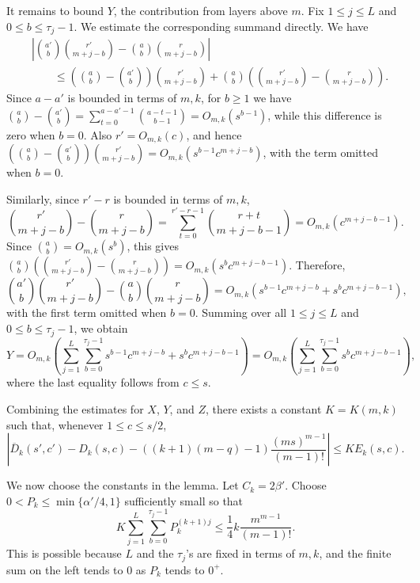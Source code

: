 \documentclass[10pt,a4paper]{article}
\numberwithin{equation}{section}
\theoremstyle{definition}
\begin{document}
It remains to bound $Y$, the contribution from layers above $m$.
Fix $1\le j\le L$ and $0\le b\le\tau_j-1$.
We estimate the corresponding summand directly.
We have
\begin{align*}
         & \left|
        \binom{a'}b\binom{r'}{m+j-b}
        -
        \binom ab\binom r{m+j-b}
        \right|      \\
         & \qquad\le
        \left(\binom ab-\binom{a'}b\right)
        \binom{r'}{m+j-b}
        +
        \binom ab
        \left(
        \binom{r'}{m+j-b}-\binom r{m+j-b}
        \right).
\end{align*}
Since $a-a'$ is bounded in terms of $m,k$, for $b\ge1$ we have $\binom ab-\binom{a'}b = \sum_{t=0}^{a-a'-1}\binom{a-t-1}{b-1} = O_{m,k}(s^{b-1})$, while this difference is zero when $b=0$.
Also $r'=O_{m,k}(c)$, and hence $\left(\binom ab-\binom{a'}b\right) \binom{r'}{m+j-b} = O_{m,k}\left(s^{b-1}c^{m+j-b}\right)$, with the term omitted when $b=0$.

Similarly, since $r'-r$ is bounded in terms of $m,k$,
\[
        \binom{r'}{m+j-b}-\binom r{m+j-b}
        =
        \sum_{t=0}^{r'-r-1}\binom{r+t}{m+j-b-1}
        =
        O_{m,k}\left(c^{m+j-b-1}\right).
\]
Since $\binom ab=O_{m,k}(s^b)$, this gives $\binom ab \left( \binom{r'}{m+j-b}-\binom r{m+j-b} \right) = O_{m,k}\left(s^bc^{m+j-b-1}\right)$.
Therefore,
\[
        \binom{a'}b\binom{r'}{m+j-b}
        -
        \binom ab\binom r{m+j-b}
        =
        O_{m,k}
        \left(
        s^{b-1}c^{m+j-b}
        +
        s^bc^{m+j-b-1}
        \right),
\]
with the first term omitted when $b=0$.
Summing over all $1\le j\le L$ and $0\le b\le\tau_j-1$, we obtain
\[
        Y
        =O_{m,k}\left(\sum_{j=1}^{L}\sum_{b=0}^{\tau_j-1}
        s^{b-1}c^{m+j-b}
        +
        s^bc^{m+j-b-1}
        \right)=
        O_{m,k}\left(
        \sum_{j=1}^{L}\sum_{b=0}^{\tau_j-1}
        s^bc^{m+j-b-1}
        \right),
\]
where the last equality follows from $c\le s$.

Combining the estimates for $X$, $Y$, and $Z$, there exists a constant $K=K(m,k)$ such that, whenever $1\le c\le s/2$,
\begin{equation}\label{eq:low-layer-clean-estimate}
        \left|
        \overline D_k(s',c')-D_k(s,c)
        -
        \left((k+1)(m-q)-1\right)
        \frac{(ms)^{m-1}}{(m-1)!}
        \right|
        \le K E_k(s,c).
\end{equation}

We now choose the constants in the lemma.
Let $C_k=2\beta'$.
Choose $0<P_k\le \min\{\alpha'/4,1\}$ sufficiently small so that
\[
        K
        \sum_{j=1}^{L}\sum_{b=0}^{\tau_j-1}
        P_k^{(k+1)j}
        \le
        \frac14 k\frac{m^{m-1}}{(m-1)!}.
\]
This is possible because $L$ and the $\tau_j$'s are fixed in terms of $m,k$, and the finite sum on the left tends to $0$ as $P_k$ tends to $0^+$.
\end{document}

